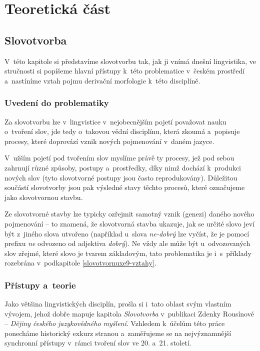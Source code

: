 \part{Teoretická část}

\hypertarget{slovotvorba}{%
\chapter{Slovotvorba}\label{slovotvorba}}

V~této kapitole si představíme slovotvorbu tak, jak ji vnímá dnešní
lingvistika, ve stručnosti si popíšeme hlavní přístupy k~této
problematice v~českém prostředí a~nastíníme vztah pojmu derivační
morfologie k~této disciplíně.

\hypertarget{uvedenuxed-do-problematiky}{%
\section{Uvedení do problematiky}\label{uvedenuxed-do-problematiky}}

Za slovotvorbu lze v~lingvistice v~nejobecnějším pojetí považovat nauku
o~tvoření slov, jde tedy o~takovou vědní disciplínu, která zkoumá
a~popisuje procesy, které doprovází vznik nových pojmenování v~daném
jazyce.

V~užším pojetí pod tvořením slov myslíme právě ty procesy, jež pod sebou
zahrnují různé způsoby, postupy a~prostředky, díky nimž dochází
k~produkci nových slov (tyto slovotvorné postupy jsou často
reprodukovány). Důležitou součástí slovotvorby jsou pak výsledné stavy
těchto procesů, které označujeme jako slovotvornou stavbu.
\parencite[92]{dokulil00}

Ze slovotvorné stavby lze typicky ozřejmit samotný vznik (genezi) daného
nového pojmenování -- to znamená, že slovotvorná stavba ukazuje, jak se
určité slovo jeví být z~jiného slova utvořeno (například u~slova
\emph{ne-dobrý} lze vyčíst, že je pomocí prefixu \emph{ne} odvozeno od
adjektiva \emph{dobrý}). Ne vždy ale může být u~odvozovaných slov
zřejmé, které slovo je tvarem základovým, tato problematika je
i~s~příklady rozebrána v~podkapitole \ref{slovotvornuxe9-vztahy}.
\parencite[92--93]{dokulil00}

\hypertarget{pux159uxedstupy-a-teorie}{%
\section{Přístupy a~teorie}\label{pux159uxedstupy-a-teorie}}

Jako většina lingvistických disciplín, prošla si i~tato oblast svým
vlastním vývojem, jehož dobře mapuje kapitola \emph{Slovotvorba}
v~publikaci Zdenky Rousínové -- \emph{Dějiny českého jazykovědného
myšlení}. Vzhledem k~účelům této práce ponecháme historický exkurz
stranou a~zaměřujeme se na nejvýznamnější synchronní přístupy v~rámci
tvoření slov ve 20. a~21. století.

